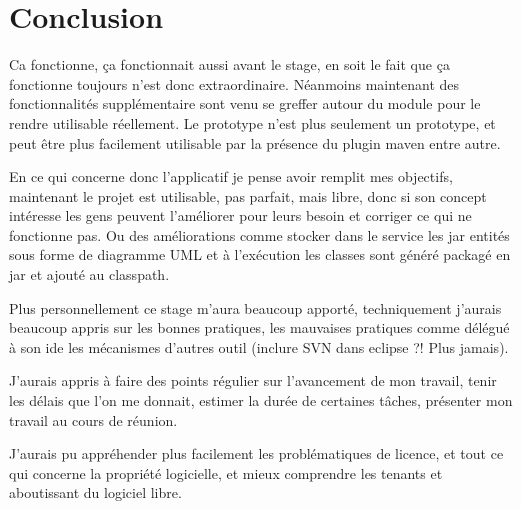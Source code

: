 \section{Conclusion}

Ca fonctionne, ça fonctionnait aussi avant le stage, en soit le fait que ça 
fonctionne toujours n'est donc extraordinaire. Néanmoins maintenant des 
fonctionnalités supplémentaire sont venu se greffer autour du module pour le 
rendre utilisable réellement. Le prototype n'est plus seulement un prototype, 
et peut être plus facilement utilisable par la présence du plugin maven entre
autre.

En ce qui concerne donc l'applicatif je pense avoir remplit mes objectifs, 
maintenant le projet est utilisable, pas parfait, mais libre, donc si son concept
intéresse les gens peuvent l'améliorer pour leurs besoin et corriger ce qui ne
fonctionne pas. Ou des améliorations comme stocker dans le service les jar
entités sous forme de diagramme UML et à l'exécution les classes sont généré 
packagé en jar et ajouté au classpath.

Plus personnellement ce stage m'aura beaucoup apporté, techniquement j'aurais
beaucoup appris sur les bonnes pratiques, les mauvaises pratiques comme délégué
à son ide les mécanismes d'autres outil (inclure SVN dans eclipse ?! Plus jamais).

J'aurais appris à faire des points régulier sur l'avancement de mon travail,
tenir les délais que l'on me donnait, estimer la durée de certaines tâches, 
présenter mon travail au cours de réunion.

J'aurais pu appréhender plus facilement les problématiques de licence, et tout
ce qui concerne la propriété logicielle, et mieux comprendre les tenants et 
aboutissant du logiciel libre.

